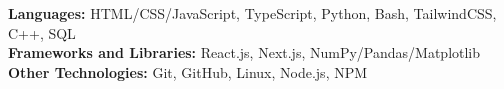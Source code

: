 

\begin{cvparagraph}

\textbf{Languages:} HTML/CSS/JavaScript, TypeScript, Python, Bash, TailwindCSS, C++, SQL \\
\textbf{Frameworks and Libraries:} React.js, Next.js, NumPy/Pandas/Matplotlib \\
\textbf{Other Technologies:} Git, GitHub, Linux, Node.js, NPM 
    
\end{cvparagraph}
